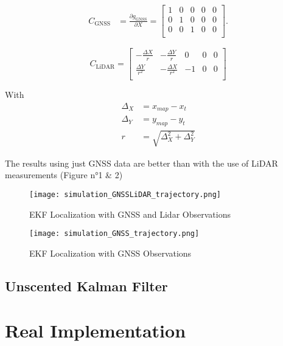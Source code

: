 \documentclass[conference]{IEEEtran}
\begin{document}
\begin{align*}
    C_{\text{GNSS}} &= \frac{\partial g_\text{GNSS}}{\partial X} =
    \begin{bmatrix}
    1 & 0 & 0 & 0 & 0\\
    0 & 1 & 0 & 0 & 0\\
    0 & 0 & 1 & 0 & 0\\
    \end{bmatrix}.
\end{align*}

\[
C_{\text{LiDAR}} =
\begin{bmatrix}
-\frac{\Delta X}{r} & -\frac{\Delta Y}{r} & 0 & 0 & 0 \\
\frac{\Delta Y}{r^2} & -\frac{\Delta X}{r^2} & -1 & 0 & 0 \\
\end{bmatrix}
\]

With 
\begin{align*}
    \Delta_X &= x_{map} - x_t \\ 
    \Delta_Y &= y_{map} - y_t \\ 
    r &= \sqrt{\Delta_X^2 + \Delta_Y^2}
\end{align*}

The results using just GNSS data are better than with the use of LiDAR measurements (Figure n°1 \& 2)

\begin{figure}[H]
    \centering
    \texttt{[image: simulation\_GNSSLiDAR\_trajectory.png]}
    \caption{EKF Localization with GNSS and Lidar Observations}
    \label{fig:enter-label}
\end{figure}

\begin{figure}[H]
    \centering
    \texttt{[image: simulation\_GNSS\_trajectory.png]}
    \caption{EKF Localization with GNSS Observations}
    \label{fig:enter-label}
\end{figure}




\subsection{Unscented Kalman Filter}

\newpage

\section{Real Implementation}
\end{document}
